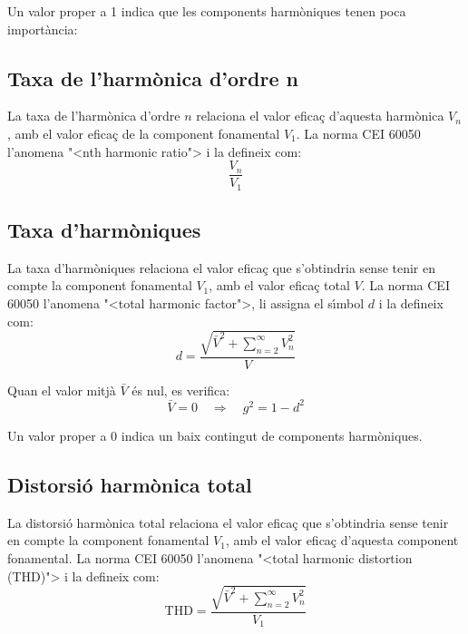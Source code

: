 Un valor proper a 1 indica  que les components harm\`{o}niques tenen poca import\`{a}ncia:

\subsection{Taxa de l'harm\`{o}nica d'ordre n}

La taxa de l'harm\`{o}nica d'ordre $n$  relaciona el valor efica\c{c} d'aquesta harm\`{o}nica  $V_n$, amb el valor efica\c{c} de la component fonamental
 $V_1$. La norma \textsf{CEI 60050} l'anomena {"<}nth harmonic ratio{">} i la defineix com:
\begin{equation}
    \frac{V_n}{V_1}
\end{equation}


\subsection{Taxa d'harm\`{o}niques}
 

La taxa d'harm\`{o}niques relaciona el valor efica\c{c}  que
s'obtindria sense tenir en compte  la component fonamental $V_1$, amb el valor
efica\c{c} total $V$. La norma \textsf{CEI 60050} l'anomena {"<}total harmonic factor{">}, li assigna el s\'{\i}mbol $d$ i la defineix com:
\begin{equation}
    d = \frac{\sqrt{\bar{V}^2+\displaystyle\sum_{n=2}^\infty V^2_n}}{V}
\end{equation}

Quan el valor mitj\`{a} $\bar{V}$ \'{e}s nul, es verifica:
\begin{equation}
    \bar{V}=0 \quad \Rightarrow\quad g^2 = 1 - d^2
\end{equation}

Un valor proper a 0 indica un baix contingut de components harm\`{o}niques.

\subsection{Distorsi\'{o} harm\`{o}nica total} 

 La distorsi\'{o} harm\`{o}nica total  relaciona el valor efica\c{c}  que
s'obtindria sense tenir en compte  la component fonamental $V_1$,
amb el valor efica\c{c} d'aquesta component fonamental. La norma \textsf{CEI 60050} l'anomena {"<}total harmonic distortion (THD){">} i la defineix com:
\begin{equation}
    \text{THD} = \frac{\sqrt{\bar{V}^2+  \displaystyle\sum_{n=2}^\infty V^2_n}} {V_1}
\end{equation}

